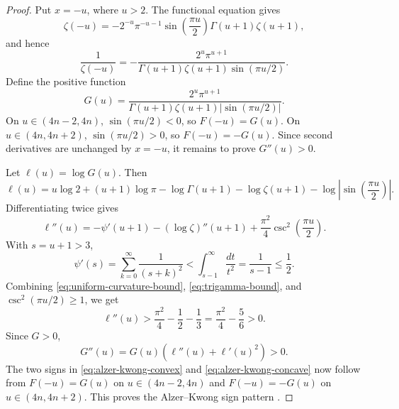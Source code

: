 \documentclass[11pt]{article}
\numberwithin{equation}{section}
\theoremstyle{definition}
\theoremstyle{remark}
\newcommand{\1}{\mathbf 1}
\begin{document}
\begin{proof}
Put \(x=-u\), where \(u>2\).  The functional equation gives
\begin{equation}
\label{eq:zeta-functional-equation-negative-axis}
\zeta(-u)
=-2^{-u}\pi^{-u-1}\sin\left(\frac{\pi u}{2}\right)\Gamma(u+1)\zeta(u+1),
\end{equation}
and hence
\begin{equation}
\label{eq:reciprocal-zeta-negative-axis}
\frac1{\zeta(-u)}
=-\frac{2^u\pi^{u+1}}
{\Gamma(u+1)\zeta(u+1)\sin(\pi u/2)}.
\end{equation}
Define the positive function
\begin{equation}
\label{eq:alzer-g-function}
G(u)=
\frac{2^u\pi^{u+1}}
{\Gamma(u+1)\zeta(u+1)|\sin(\pi u/2)|}.
\end{equation}
On \(u\in(4n-2,4n)\), \(\sin(\pi u/2)<0\), so \(F(-u)=G(u)\).  On \(u\in(4n,4n+2)\), \(\sin(\pi u/2)>0\), so \(F(-u)=-G(u)\).  Since second derivatives are unchanged by \(x=-u\), it remains to prove \(G''(u)>0\).

Let \(\ell(u)=\log G(u)\).  Then
\begin{equation}
\label{eq:alzer-log-g}
\ell(u)=u\log2+(u+1)\log\pi-\log\Gamma(u+1)-\log\zeta(u+1)
-\log\left|\sin\left(\frac{\pi u}{2}\right)\right|.
\end{equation}
Differentiating twice gives
\begin{equation}
\label{eq:alzer-log-g-second}
\ell''(u)
=-\psi'(u+1)-(\log\zeta)''(u+1)
+\frac{\pi^2}{4}\csc^2\left(\frac{\pi u}{2}\right).
\end{equation}
With \(s=u+1>3\),
\begin{equation}
\label{eq:trigamma-bound}
\psi'(s)=\sum_{k=0}^{\infty}\frac1{(s+k)^2}
<
\int_{s-1}^{\infty}\frac{dt}{t^2}
=\frac1{s-1}\le\frac12.
\end{equation}
Combining \eqref{eq:uniform-curvature-bound}, \eqref{eq:trigamma-bound}, and \(\csc^2(\pi u/2)\ge1\), we get
\begin{equation}
\label{eq:alzer-log-convexity}
\ell''(u)>
\frac{\pi^2}{4}-\frac12-\frac13
=\frac{\pi^2}{4}-\frac56>0.
\end{equation}
Since \(G>0\),
\begin{equation}
\label{eq:alzer-g-second-positive}
G''(u)=G(u)(\ell''(u)+\ell'(u)^2)>0.
\end{equation}
The two signs in \eqref{eq:alzer-kwong-convex} and \eqref{eq:alzer-kwong-concave} now follow from \(F(-u)=G(u)\) on \(u\in(4n-2,4n)\) and \(F(-u)=-G(u)\) on \(u\in(4n,4n+2)\).  This proves the Alzer--Kwong sign pattern \cite{alzer-kwong}.
\end{proof}
\end{document}

